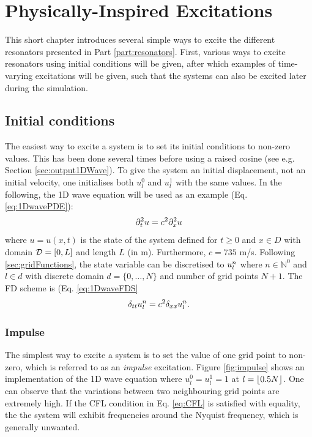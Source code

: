 \chapter{Physically-Inspired Excitations}\label{ch:physInspExcitations}
This short chapter introduces several simple ways to excite the different resonators presented in Part \ref{part:resonators}. First, various ways to excite resonators using initial conditions will be given, after which examples of time-varying excitations will be given, such that the systems can also be excited later during the simulation.

\section{Initial conditions}\label{sec:initConditionsPhysInsp}
The easiest way to excite a system is to set its initial conditions to non-zero values. This has been done several times before using a raised cosine (see e.g. Section \ref{sec:output1DWave}). To give the system an initial displacement, not an initial velocity, one initialises both $u^0_l$ and $u^1_l$ with the same values. In the following, the 1D wave equation will be used as an example (Eq. \eqref{eq:1DwavePDE}):
\begin{equation}
    \partial_t^2 u = c^2 \partial_x^2 u
\end{equation}
where $u=u(x,t)$ is the state of the system defined for $t\geq 0$ and $x\in D$ with domain $\mathcal{D} = [0, L]$ and length $L$ (in m). Furthermore, $c = 735$ m/s. Following \ref{sec:gridFunctions}, the state variable can be discretised to $u_l^n$ where $n\in \mathbb{N}^0$ and $l\in d$ with discrete domain $d = \{0, \hdots, N\}$ and number of grid points $N+1$. The FD scheme is (Eq. \eqref{eq:1DwaveFDS}
\begin{equation}
    \delta_{tt} u_l^n = c^2 \delta_{xx} u_l^n.
\end{equation}

\subsection{Impulse}
The simplest way to excite a system is to set the value of one grid point to non-zero, which is referred to as an \textit{impulse} excitation. Figure \ref{fig:impulse} shows an implementation of the 1D wave equation where $u_l^0 = u_l^1 = 1$ at $l = \floor[0.5 N]$. One can observe that the variations between two neighbouring grid points are extremely high. If the CFL condition in Eq. \eqref{eq:CFL} is satisfied with equality, the the system will exhibit frequencies around the Nyquist frequency, which is generally unwanted.

